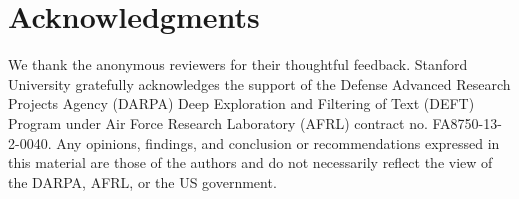 \documentclass[11pt]{article}
\newcommand\n[1]{\textit{#1}} %
\begin{document}
%


\section*{Acknowledgments}

We thank the anonymous reviewers for their thoughtful feedback.
Stanford University gratefully acknowledges the support of the Defense
Advanced Research Projects Agency (DARPA) Deep Exploration and Filtering
of Text (DEFT) Program under Air Force Research Laboratory (AFRL)
contract no. FA8750-13-2-0040. Any opinions, findings, and conclusion or
recommendations expressed in this material are those of the authors and
do not necessarily reflect the view of the DARPA, AFRL, or the US
government.



\end{document}
